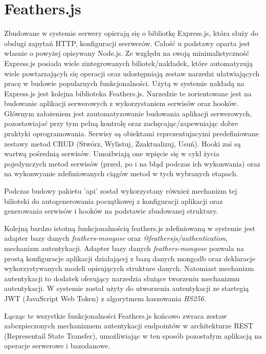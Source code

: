 \section{Feathers.js}
Zbudowane w systemie serwery opierają się o bibliotkę Express.js, która służy do obslugi zapytań HTTP, konfiguracji seerwerów. Całość u podstawy oparta jest własnie o powyżej opisywany Node.js. Ze względu na swoją minimalistyczność Express.js posiada wiele zintegrowanych biliotek/nakładek, które automatyzują wiele powtarzającyh się operacji oraz udostępniają zestaw narzedzi ułatwiających pracę w budowie popularnych funkcjonalności. Użytą w systemie nakładą na Express.js jest kolejna biblioteka Feathers.js. Narzedzie te zorientowane jest na budowanie aplikacji serwerowych z wykorzystaniem serwisów oraz hooków. Głównym założeniem jest zautomatyzowanie budowania aplikacji serwerowych, pozostawiajać przy tym pełną kontrolę oraz zachęcając/zapewniając dobre praktyki oprogramowania. Serwisy są obiektami reprezentujacymi predefiniowane zestawy metod CRUD (Stwórz, Wylistuj, Zzaktualizuj, Usuń). Hooki zaś są wartwą pośrednią serwisów. Umożlwiają one wpięcie się w cykl życia pojedynczych metod serwisów (przed, po i na błąd podczas ich wykonwania) oraz na wykonwyanie zdefiniowanych ciągów metod w tych wybranych etapach. \cite{FeathersDocs}

Podczas budowy pakietu 'api' został wykorzystany również mechanizm tej bilioteki do autogenerowania początkowej z  konfiguracji aplikacji oraz generowania serwisów i hooków na podstawie zbudowanej struktury.

Kolejną bardzo istotną funkcjonalnością feathers.js zdefiniowaną w systemie jest adapter bazy danych \textit{feathers-mongose} oraz \textit{@feathersjs/authentication}, mechanizm autentykacji. Adapter bazy danych \textit{feathers-mongose} pozwala na prostą konfiguracje aplikacji działającej z bazą danych mongodb oraz deklaracje wykorzystywanych modeli opisujących strukture danych. Natomiast mechanizm autentykacji to dodatek oferujący narzedzia służące tworzeniu mechanizmu autentykacji. W systemie został użyty do utworzenia autentykacji ze startegią JWT (JavaScript Web Token) z algorytmem haszowania \textit{HS256}. 

Łącząc te wszystkie funkcjonalności Feathers.js końcowo zwraca zestaw zabezpieczonych mechanizmem autentykacji endpointów w architekturze REST (Representail State Transfer), umożliwiając w ten sposób pozostałym aplikacją na operacje serwerowe i bazodanowe.

